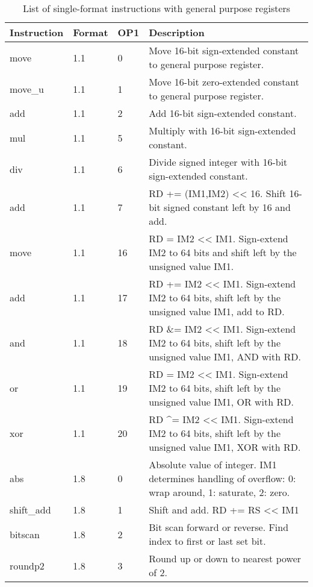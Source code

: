 \documentclass[forwardcom.tex]{subfiles}
\begin{document}
\begin{longtable} {|p{25mm}|p{12mm}|p{12mm}|p{95mm}|}
\caption{List of single-format instructions with general purpose registers} 
\label{table:ListOfSingleFormatInstructionsGP} \\
\endfirsthead
\endhead
\hline
\bfseries Instruction & \bfseries Format &\bfseries OP1 & \bfseries Description \\
\hline
move          & 1.1   &  0 & Move 16-bit sign-extended constant to general purpose register. \\
move\_u       & 1.1   &  1 & Move 16-bit zero-extended constant to general purpose register. \\
add           & 1.1   &  2  & Add 16-bit sign-extended constant. \\
mul           & 1.1   &  5  & Multiply with 16-bit sign-extended constant. \\
div           & 1.1   &  6  & Divide signed integer with 16-bit sign-extended constant. \\
add           & 1.1   &  7  & RD += (IM1,IM2) \textless\textless{} 16. Shift 16-bit signed constant left by 16 and add. \\
move          & 1.1   & 16  & RD = IM2 \textless\textless{} IM1. Sign-extend IM2 to 64 bits and shift left by the unsigned value IM1. \\
add           & 1.1   & 17  & RD += IM2 \textless\textless{} IM1. Sign-extend IM2 to 64 bits, shift left by the unsigned value IM1, add to RD. \\
and           & 1.1   & 18  & RD \&= IM2 \textless\textless{} IM1. Sign-extend IM2 to 64 bits, shift left by the unsigned value IM1, AND with RD. \\
or            & 1.1   & 19  & RD \textbar{}= IM2 \textless\textless{} IM1. Sign-extend IM2 to 64 bits, shift left by the unsigned value IM1, OR with RD. \\
xor           & 1.1   & 20  & RD \^{}= IM2 \textless\textless{} IM1. Sign-extend IM2 to 64 bits, shift left by the unsigned value IM1, XOR with RD. \\
abs           & 1.8   &  0  & Absolute value of integer. IM1 determines handling of overflow: 0: wrap around, 1: saturate, 2: zero. \\
shift\_add    & 1.8   &  1  & Shift and add. RD += RS \textless\textless{} IM1 \\
bitscan       & 1.8   &  2 & Bit scan forward or reverse. Find index to first or last set bit. \\
roundp2       & 1.8   &  3 & Round up or down to nearest power of 2. \\

\end{longtable}
\end{document}
